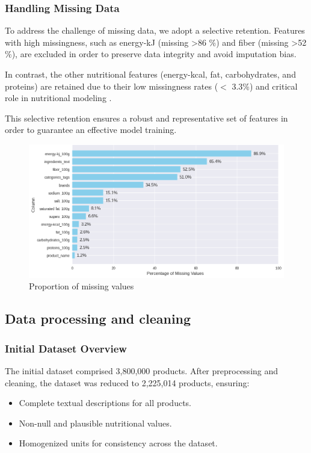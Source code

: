 \subsubsection{Handling Missing Data}
To address the challenge of missing data, we adopt a selective retention. Features with high missingness, such as energy-kJ  (missing >86 \%) and fiber (missing >52 \%), are excluded in order to preserve data integrity and avoid imputation bias. 
\par In contrast, the other nutritional features (energy-kcal,
fat, carbohydrates, and proteins) are retained due to their low missingness rates  ($<$ 3.3\%) and critical role in nutritional modeling \cite{stoian2020machine}.


This selective
retention ensures a robust and representative set of features in order to guarantee an effective model training.

\begin{center}
\begin{figure}[H]
\includegraphics[scale=0.35]{images/missing_values.png}
\caption{Proportion of missing values} 
\label{fig:missing_values}
\end{figure}
\end{center}

\newpage
\subsection{Data processing and cleaning}
\subsubsection{Initial Dataset Overview}
The initial dataset comprised 3,800,000 products. After preprocessing and cleaning, the dataset was reduced to 2,225,014 products, ensuring:
\begin{itemize}
    \item Complete textual descriptions for all products.
    \item Non-null and plausible nutritional values.
    \item Homogenized units for consistency across the dataset.
\end{itemize}

